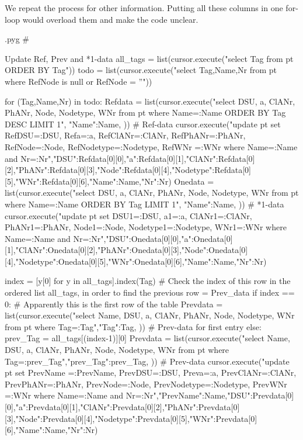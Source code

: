 \documentclass{report}
\makeatletter
\newenvironment{python}{%
  \VerbatimEnvironment
  \minted@resetoptions
  \setkeys{minted@opt}{}
      \begin{VerbatimOut}{\jobname.pyg}}
{%
      \end{VerbatimOut}
      \minted@pygmentize{python}
      \DeleteFile{\jobname.pyg}}
\makeatother
\begin{document}
We repeat the process for other information. Putting all these columns in one
for-loop would overload them and make the code unclear.

\begin{python}
#{{{ Update Ref, Prev and *1-data
all_tags = list(cursor.execute("select Tag from pt ORDER BY Tag"))
todo = list(cursor.execute("select Tag,Name,Nr from pt where RefNode is null or RefNode = ''"))

for (Tag,Name,Nr) in todo:
    Refdata = list(cursor.execute("select DSU, a, ClANr, PhANr, Node, Nodetype, WNr from pt where Name=:Name ORDER BY Tag DESC LIMIT 1", {"Name":Name, })) # Ref-data
    cursor.execute("update pt set RefDSU=:DSU, Refa=:a, RefClANr=:ClANr, RefPhANr=:PhANr, RefNode=:Node, RefNodetype=:Nodetype, RefWNr =:WNr where Name=:Name and Nr=:Nr",{"DSU":Refdata[0][0],"a":Refdata[0][1],"ClANr":Refdata[0][2],"PhANr":Refdata[0][3],"Node":Refdata[0][4],"Nodetype":Refdata[0][5],"WNr":Refdata[0][6],"Name":Name,"Nr":Nr}) 
    Onedata = list(cursor.execute("select DSU, a, ClANr, PhANr, Node, Nodetype, WNr from pt where Name=:Name ORDER BY Tag LIMIT 1", {"Name":Name, })) # *1-data
    cursor.execute("update pt set DSU1=:DSU, a1=:a, ClANr1=:ClANr, PhANr1=:PhANr, Node1=:Node, Nodetype1=:Nodetype, WNr1=:WNr where Name=:Name and Nr=:Nr",{"DSU":Onedata[0][0],"a":Onedata[0][1],"ClANr":Onedata[0][2],"PhANr":Onedata[0][3],"Node":Onedata[0][4],"Nodetype":Onedata[0][5],"WNr":Onedata[0][6],"Name":Name,"Nr":Nr}) 

    index = [y[0] for y in all_tags].index(Tag)  # Check the index of this row in the ordered list all_tags, in order to find the previous row = Prev_data 
    if index == 0:  # Apparently this is the first row of the table
        Prevdata = list(cursor.execute("select Name, DSU, a, ClANr, PhANr, Node, Nodetype, WNr from pt where Tag=:Tag",{"Tag":Tag, })) # Prev-data for first entry
    else:
        prev_Tag = all_tags[(index-1)][0]
        Prevdata = list(cursor.execute("select Name, DSU, a, ClANr, PhANr, Node, Nodetype, WNr from pt where Tag=:prev_Tag",{"prev_Tag":prev_Tag, })) # Prev-data
    cursor.execute("update pt set PrevName =:PrevName, PrevDSU=:DSU, Preva=:a, PrevClANr=:ClANr, PrevPhANr=:PhANr, PrevNode=:Node, PrevNodetype=:Nodetype, PrevWNr =:WNr where Name=:Name and Nr=:Nr",{"PrevName":Name,"DSU":Prevdata[0][0],"a":Prevdata[0][1],"ClANr":Prevdata[0][2],"PhANr":Prevdata[0][3],"Node":Prevdata[0][4],"Nodetype":Prevdata[0][5],"WNr":Prevdata[0][6],"Name":Name,"Nr":Nr}) 

}}}
\end{python}
\end{document}
